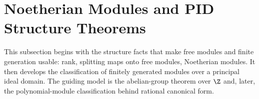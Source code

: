 \section{Noetherian Modules and PID Structure Theorems}

This subsection begins with the structure facts that make free modules and
finite generation usable: rank, splitting maps onto free modules, Noetherian
modules. It then develops the classification of
finitely generated modules over a principal ideal domain. The guiding model is
the abelian-group theorem over $\Z$ and, later, the polynomial-module
classification behind rational canonical form.






